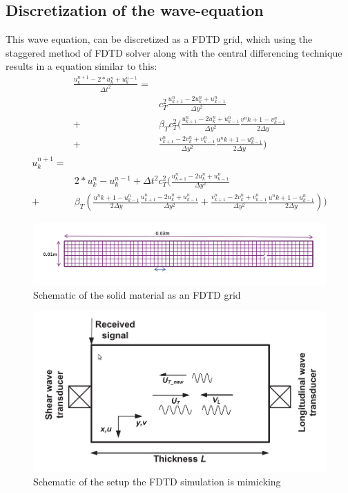 \subsection{Discretization of the wave-equation}
This wave equation, can be discretized as a FDTD grid, which using the staggered method of FDTD solver along with the central differencing technique results in a equation similar to this:
\begin{equation}
\begin{aligned}
\frac{u^{n+1}_{k} - 2*u^n_k + u^{n-1}_k}{\Delta t^2} = \\
 & c_T^2\frac{u^n_{k+1} - 2 u^n_k + u^n_{k-1}}{\Delta y^2} \\
+ &  \beta_T c_T^2(\frac{u^n_{k+1} - 2 u^n_k + u^n_{k-1}}{\Delta y^2}\frac{v^n{k+1} 
- v^n_{k-1}}{2\Delta y} \\
+ & \frac{v^n_{k+1} - 2 v^n_k + v^n_{k-1}}{\Delta y^2}\frac{u^n{k+1} - u^n_{k-1}}{2\Delta y})
\end{aligned}
\end{equation}
\begin{equation}
\begin{aligned}
u^{n+1}_{k} = \\
& 2*u^n_k - u^{n-1}_k +  \Delta t^2 c_T^2(\frac{u^n_{k+1} - 2 u^n_k + u^n_{k-1}}{\Delta y^2} \\
+ & \beta_T (\frac{u^n{k+1} - u^n_{k-1}}{2\Delta y}\frac{u^n_{k+1} - 2 u^n_k + u^n_{k-1}}{\Delta y^2} +\frac{v^n_{k+1} - 2 v^n_k + v^n_{k-1}}{\Delta y^2}\frac{u^n{k+1} - u^n_{k-1}}{2\Delta y}))
\end{aligned}
\end{equation}
\begin{figure}
\begin{center}
\includegraphics[scale=0.4]{images/chapter_3/schematic_GE.png}
\caption{Schematic of the solid material as an FDTD grid}
\end{center}
\end{figure}
\begin{figure}
\begin{center}
\includegraphics[scale=0.4]{images/chapter_3/schematic_liu.jpg}
\caption{Schematic of the setup the FDTD simulation is mimicking}
\end{center}
\end{figure}
